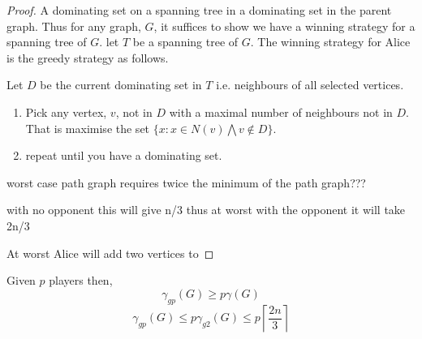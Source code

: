 \begin{proof}
    A dominating set on a spanning tree in a dominating set in the parent graph.
    Thus for any graph, $G$, it suffices to show we have a winning strategy for a spanning tree of $G$. 
    let $T$ be a spanning tree of $G$.
    The winning strategy for Alice is the greedy strategy as follows. 
    
    Let $D$ be the current dominating set in $T$ i.e. neighbours of all selected vertices.
    \begin{enumerate}
        \item Pick any vertex, $v$, not in $D$ with a maximal number of neighbours not in $D$. That is maximise the set $\{x: x \in N(v) \bigwedge v \notin D\}$.
        \item repeat until you have a dominating set.
    \end{enumerate}

       worst case path graph requires twice the minimum of the path graph???
       
       with no opponent this will give n/3 thus at worst with the opponent it will take 2n/3 
       
    At worst Alice will add two vertices to 
\end{proof}

\begin{theorem} %
    Given $p$ players then,
    \[\gamma_{gp}(G) \geq p\gamma(G) \]    
    \[\gamma_{gp}(G) \leq p \gamma_{g2}(G) \leq p\left\lceil \frac{2n}{3} \right\rceil\]
\end{theorem}













